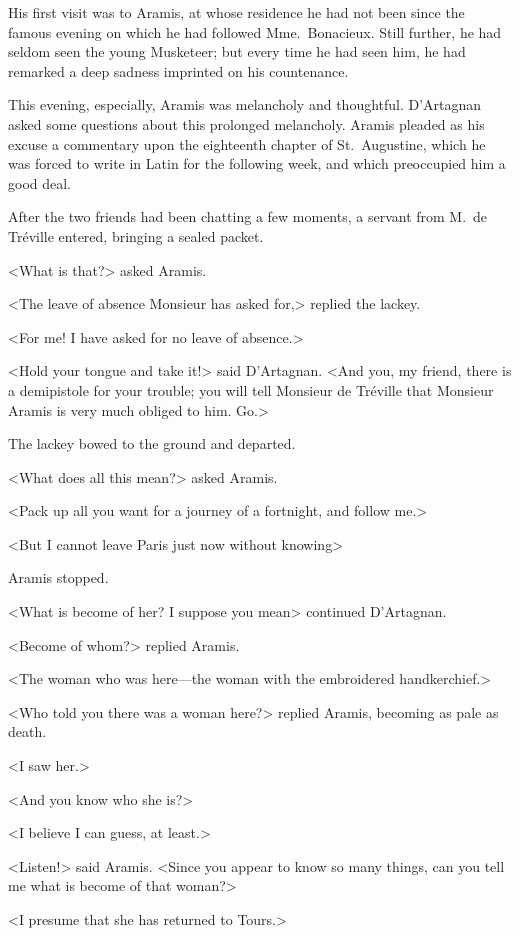 His first visit was to Aramis, at whose residence he had not been since the famous evening on which he had followed Mme.~Bonacieux. Still further, he had seldom seen the young Musketeer; but every time he had seen him, he had remarked a deep sadness imprinted on his countenance. 

This evening, especially, Aramis was melancholy and thoughtful. D'Artagnan asked some questions about this prolonged melancholy. Aramis pleaded as his excuse a commentary upon the eighteenth chapter of St.~Augustine, which he was forced to write in Latin for the following week, and which preoccupied him a good deal. 

After the two friends had been chatting a few moments, a servant from M.~de Tréville entered, bringing a sealed packet. 

<What is that?> asked Aramis. 

<The leave of absence Monsieur has asked for,> replied the lackey. 

<For me! I have asked for no leave of absence.> 

<Hold your tongue and take it!> said D'Artagnan. <And you, my friend, there is a demipistole for your trouble; you will tell Monsieur de Tréville that Monsieur Aramis is very much obliged to him. Go.> 

The lackey bowed to the ground and departed. 

<What does all this mean?> asked Aramis. 

<Pack up all you want for a journey of a fortnight, and follow me.> 

<But I cannot leave Paris just now without knowing\longdash> 

Aramis stopped. 

<What is become of her? I suppose you mean\longdash> continued D'Artagnan. 

<Become of whom?> replied Aramis. 

<The woman who was here—the woman with the embroidered handkerchief.> 

<Who told you there was a woman here?> replied Aramis, becoming as pale as death. 

<I saw her.> 

<And you know who she is?> 

<I believe I can guess, at least.> 

<Listen!> said Aramis. <Since you appear to know so many things, can you tell me what is become of that woman?> 

<I presume that she has returned to Tours.> 

